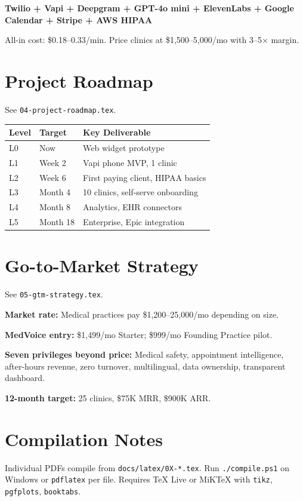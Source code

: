 \documentclass[11pt,a4paper]{report}
\begin{document}
\textbf{Twilio + Vapi + Deepgram + GPT-4o mini + ElevenLabs + Google Calendar + Stripe + AWS HIPAA}

All-in cost: \$0.18--0.33/min. Price clinics at \$1,500--5,000/mo with 3--5$\times$ margin.

\chapter{Project Roadmap}
See \texttt{04-project-roadmap.tex}.

\begin{center}
\begin{tabular}{@{}lll@{}}
\toprule
\textbf{Level} & \textbf{Target} & \textbf{Key Deliverable} \\
\midrule
L0 & Now & Web widget prototype \\
L1 & Week 2 & Vapi phone MVP, 1 clinic \\
L2 & Week 6 & First paying client, HIPAA basics \\
L3 & Month 4 & 10 clinics, self-serve onboarding \\
L4 & Month 8 & Analytics, EHR connectors \\
L5 & Month 18 & Enterprise, Epic integration \\
\bottomrule
\end{tabular}
\end{center}

\chapter{Go-to-Market Strategy}
See \texttt{05-gtm-strategy.tex}.

\textbf{Market rate:} Medical practices pay \$1,200--25,000/mo depending on size.

\textbf{MedVoice entry:} \$1,499/mo Starter; \$999/mo Founding Practice pilot.

\textbf{Seven privileges beyond price:} Medical safety, appointment intelligence, after-hours revenue, zero turnover, multilingual, data ownership, transparent dashboard.

\textbf{12-month target:} 25 clinics, \$75K MRR, \$900K ARR.

\appendix
\chapter{Compilation Notes}
Individual PDFs compile from \texttt{docs/latex/0X-*.tex}. Run \texttt{./compile.ps1} on Windows or \texttt{pdflatex} per file. Requires TeX Live or MiKTeX with \texttt{tikz}, \texttt{pgfplots}, \texttt{booktabs}.
\end{document}
